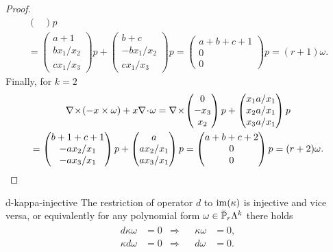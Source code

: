 \begin{proof}
\begin{multline*}
\begin{pmatrix}
    \end{pmatrix}p
    \\
    =
    \begin{pmatrix}
      a+1 \\ bx_1/x_2\\ cx_1/x_3
    \end{pmatrix}p
    +
    \begin{pmatrix}
      b+c \\ -bx_1/x_2\\cx_1/x_3
    \end{pmatrix}p
    =
    \begin{pmatrix}
      a+b+c+1 \\0\\0
    \end{pmatrix}p
    = (r+1)\omega.
  \end{multline*}
  Finally, for $k=2$
  \begin{multline*}
    \curl(-x\times \omega) + x \div \omega
    = \curl
    \begin{pmatrix}
      0 \\ -x_3 \\ x_2
    \end{pmatrix}p
    +
    \begin{pmatrix}
      x_1 a/x_1\\x_2 a/x_1\\x_3 a/x_1\\
    \end{pmatrix}p
    \\=
    \begin{pmatrix}
      b+1+c+1\\-ax_2/x_1 \\ -a x_3/x_1
    \end{pmatrix}p
    +
    \begin{pmatrix}
      a\\ax_2/x_1\\ax_3/x_1
    \end{pmatrix}p
    =
    \begin{pmatrix}
      a+b+c+2\\0\\0
    \end{pmatrix}p
    = (r+2)\omega.
  \end{multline*}
\end{proof}

\begin{Lemma}{d-kappa-injective}
  The restriction of operator $d$ to $\range \kappa$ is injective and
  vice versa, or equivalently for any polynomial form
  $\omega\in \breve \P_r\Lambda^k$ there holds
  \begin{gather}
    \label{eq:derham:16}
    \begin{aligned}
      d\kappa\omega &= 0 &\Longrightarrow&& \kappa\omega &= 0,\\
      \kappa d\omega &= 0 &\Longrightarrow&& d\omega &= 0.
    \end{aligned}
  \end{gather}
\end{Lemma}

